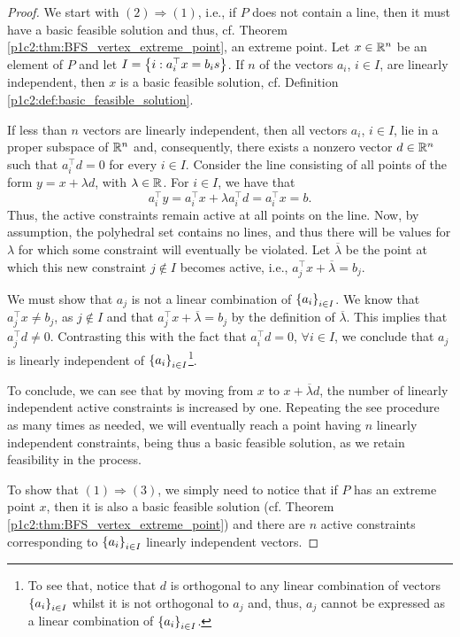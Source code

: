 \begin{proof}
We start with $(2) \Rightarrow (1)$, i.e., if $P$ does not contain a line, then it must have a basic feasible solution and thus, cf. Theorem \ref{p1c2:thm:BFS_vertex_extreme_point}, an extreme point. Let $x \in \mathbb{R}^n$ be an element of $P$ and let $I = \left\{ i : a_i^\top x = b_is \right \}$. If $n$ of the vectors $a_i$, $i \in I$, are linearly independent, then $x$ is a basic feasible solution, cf. Definition \ref{p1c2:def:basic_feasible_solution}. 

If less than $n$ vectors are linearly independent, then all vectors $a_i$, $i \in I$, lie in a proper subspace of $\mathbb{R}^n$ and, consequently, there exists a nonzero vector $d \in \mathbb{R}^n$ such that $a_i^\top d = 0$ for every $i \in I$. Consider the line consisting of all points of the form $y = x + \lambda d$, with $\lambda \in \mathbb{R}$. For $i \in I$, we have that 
	$$
	a_i^\top y = a_i^\top x + \lambda a_i^\top d = a_i^\top x = b.
	$$
	Thus, the active constraints remain active at all points on the line. Now, by assumption, the polyhedral set contains no lines, and thus there will be values for $\lambda$ for which some constraint will eventually be violated. Let $\overline{\lambda}$ be the point at which this new constraint $j \not\in I$ becomes active, i.e., $a_j^\top x + \overline{\lambda}= b_j$.
	
	We must show that $a_j$ is not a linear combination of $\left\{ a_i \right \}_{i \in I}$. We know that $a_j^\top x \neq b_j$, as $j \not\in I$ and that $a_j^\top x + \overline{\lambda}= b_j$ by the definition of $\overline{\lambda}$. This implies that $a_j^\top d \neq 0$. Contrasting this with the fact that $a_i^\top d = 0$, $\forall i \in I$, we conclude that $a_j$ is linearly independent of $\left\{ a_i \right \}_{i \in I}$\footnote{To see that, notice that $d$ is orthogonal to any linear combination of vectors $\left\{ a_i \right \}_{i \in I}$ whilst it is not orthogonal to $a_j$ and, thus, $a_j$ cannot be expressed as a linear combination of $\left\{ a_i \right \}_{i \in I}$.}. 
	
	To conclude, we can see that by moving from $x$ to $x + \overline{\lambda}d$, the number of linearly independent active constraints is increased by one. Repeating the see procedure as many times as needed, we will eventually reach a point having $n$ linearly independent constraints, being thus a basic feasible solution, as we retain feasibility in the process.
	
	To show that $(1) \Rightarrow (3)$, we simply need to notice that if $P$ has an extreme point $x$, then it is also a basic feasible solution (cf. Theorem \ref{p1c2:thm:BFS_vertex_extreme_point}) and there are $n$ active constraints corresponding to $\left\{ a_i \right \}_{i \in I}$ linearly independent vectors.


\end{proof}
